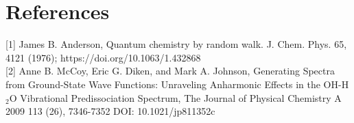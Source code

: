 \documentclass{article}
\begin{document}
\section{References}
[1] James B. Anderson, Quantum chemistry by random walk. J. Chem. Phys. 65, 4121 (1976); https://doi.org/10.1063/1.432868\\

[2] Anne B. McCoy, Eric G. Diken, and Mark A. Johnson, Generating Spectra from Ground-State Wave Functions: Unraveling Anharmonic Effects in the OH-H$_{2}$O Vibrational Predissociation Spectrum, The Journal of Physical Chemistry A 2009 113 (26), 7346-7352
DOI: 10.1021/jp811352c
\end{document}
